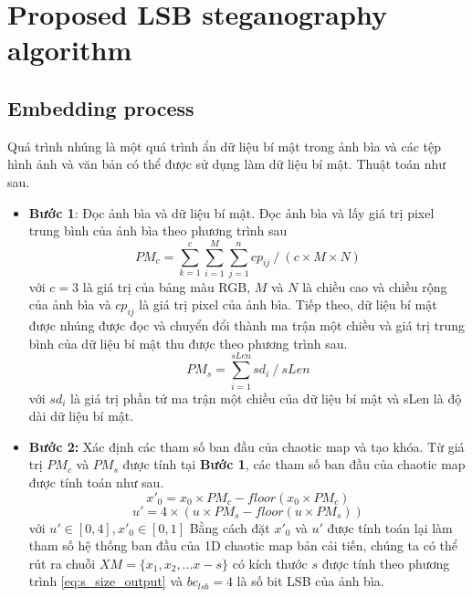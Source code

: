 \section{Proposed LSB steganography algorithm}
\subsection{Embedding process}

Quá trình nhúng là một quá trình ẩn dữ liệu bí mật trong ảnh bìa và các tệp hình ảnh và văn bản có thể được sử dụng làm dữ liệu bí mật. Thuật toán như sau.

\begin{itemize}
    \item \textbf{Bước 1}: Đọc ảnh bìa và dữ liệu bí mật.
    Đọc ảnh bìa và lấy giá trị pixel trung bình của ảnh bìa theo phương trình sau
    \begin{equation}
    \label{eq:read_cover_secret}
    PM_c = \sum_{k=1}^c \sum_{i=1}^M \sum_{j=1}^n cp_{ij} \mathbin{/} (c \times M \times N)
    \end{equation}
    với $c=3$ là giá trị của bảng màu RGB, $M$ và $N$ là chiều cao và chiều rộng của ảnh bìa và $cp_{ij}$ là giá trị pixel của ảnh bìa. 
    Tiếp theo, dữ liệu bí mật được nhúng được đọc và chuyển đổi thành ma trận một chiều và giá trị trung bình của dữ liệu bí mật thu được theo phương trình sau.
    \begin{equation}
    \label{eq:secret_data}
    PM_s = \sum_{i=1}^{sLen} sd_i \mathbin{/} sLen
    \end{equation}
    với $sd_i$ là giá trị phần tử ma trận một chiều của dữ liệu bí mật và sLen là độ dài dữ liệu bí mật.
    \item \textbf{Bước 2:} Xác định các tham số ban đầu của chaotic map và tạo khóa.
    Từ giá trị $PM_c$ và $PM_s$ được tính tại \textbf{Bước 1}, các tham số ban đầu của chaotic map được tính toán như sau.
    \begin{equation}
    \label{eq:chaotic_x0}
    x'_0 = x_0 \times PM_c - floor(x_0 \times PM_c)
    \end{equation}
    \begin{equation}
    \label{eq:chaotic_u}
   u' = 4 \times (u \times PM_s - floor(u \times PM_s))
    \end{equation}
    với $u' \in [0,4], x'_0 \in [0,1]$
    Bằng cách đặt $x'_0$ và $u'$ được tính toán lại làm tham số hệ thống ban đầu của 1D chaotic map bản cải tiến, chúng ta có thể rút ra chuỗi $XM = \{x_1, x_2,...x-s \}$ có kích thước $s$ được tính theo phương trình \ref{eq:s_size_output} và $bc_{lsb}=4$ là số bit LSB của ảnh bìa.

\end{itemize}
